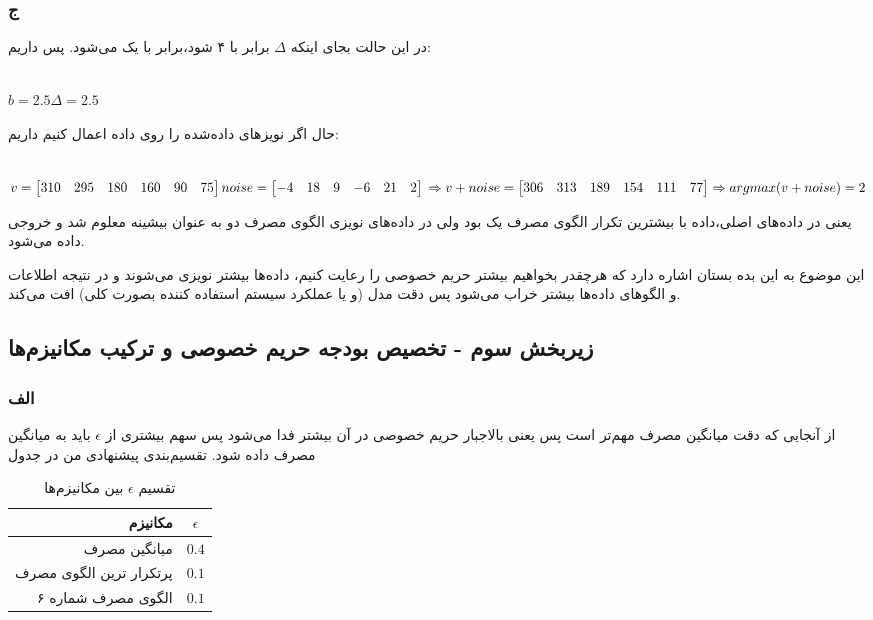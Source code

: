 \subsubsection{ج}
در این حالت بجای اینکه 
$\Delta$
برابر با ۴ شود،‌برابر با یک می‌شود. پس داریم:
\begin{latin}
	~\\
	$
	b = 2.5 \Delta = 2.5
	$
\end{latin}
حال اگر نویزهای داده‌شده را روی داده اعمال کنیم داریم:
\begin{latin}
	~\\
	$
	v = \begin{bmatrix}
		310 & 295 & 180 & 160 & 90 & 75
	\end{bmatrix}
	\\
	noise = \begin{bmatrix}
		-4 & 18 & 9 & -6 & 21 & 2
	\end{bmatrix}
	\\
	\Rightarrow 
	v + noise = \begin{bmatrix}
		306 & 313 & 189 & 154 & 111 & 77
	\end{bmatrix}
	\Rightarrow argmax(v + noise) = 2
	$
\end{latin}
یعنی در داده‌های اصلی،‌داده با بیشترین تکرار الگوی مصرف یک بود ولی در داده‌های نویزی الگوی مصرف دو به عنوان بیشینه معلوم شد و خروجی داده می‌شود. 

این موضوع به این بده بستان اشاره دارد که هرچقدر بخواهیم بیشتر حریم خصوصی را رعایت کنیم، داده‌ها بیشتر نویزی می‌شوند و در نتیجه اطلاعات و الگوهای داده‌ها بیشتر خراب می‌شود پس دقت مدل (و یا عملکرد سیستم استفاده کننده بصورت کلی) افت می‌کند.

\subsection{زیربخش سوم - تخصیص بودجه حریم خصوصی و ترکیب مکانیزم‌ها}
\subsubsection{الف}
از آنجایی که دقت میانگین مصرف مهم‌تر است پس یعنی بالاجبار حریم خصوصی در آن بیشتر فدا می‌شود پس سهم بیشتری از 
$\epsilon$
باید به میانگین مصرف داده شود. تقسیم‌بندی پیشنهادی من در جدول 

\begin{table}[H]
	\centering
	\caption{تقسیم $\epsilon$ بین مکانیزم‌ها}
	\label{tab:eps_tokhs}
	

		\begin{tabular}{| r | c|}
			\hline
			\textbf{مکانیزم} & $\epsilon$ \\
			\hline
			میانگین مصرف & $0.4$ \\
			پرتکرار ترین الگوی مصرف & $0.1$ \\
			الگوی مصرف شماره ۶ & $0.1$ \\
			\hline
		\end{tabular}

	
\end{table}

